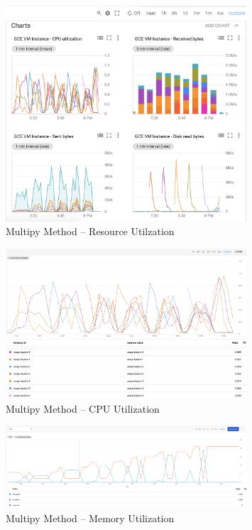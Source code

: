 \documentclass{prog_report}
\begin{document}
\begin{figure}[h]
    \centering
    \includegraphics[width=0.8\textwidth]{img/multiply-resources}
    \caption{Multipy Method – Resource Utilzation}
    \label{fig:multiply-resources}
\end{figure}

\begin{figure}[h]
    \centering
    \includegraphics[width=0.8\textwidth]{img/multiply-cpu}
    \caption{Multipy Method – CPU Utilization}
    \label{fig:multiply-cpu}
\end{figure}

\begin{figure}[h]
    \centering
    \includegraphics[width=0.8\textwidth]{img/multiply-memory}
    \caption{Multipy Method – Memory Utilization}
    \label{fig:multiply-mem}
\end{figure}
\end{document}

